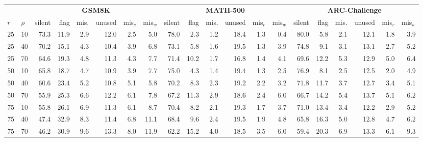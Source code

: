 \begin{tabular}{ll rrrrrr rrrrrr rrrrrr}
\toprule
& & \multicolumn{6}{c}{\textbf{GSM8K}} & \multicolumn{6}{c}{\textbf{MATH-500}} & \multicolumn{6}{c}{\textbf{ARC-Challenge}} \\
\cmidrule(lr){3-8}\cmidrule(lr){9-14}\cmidrule(lr){15-20}
\textbf{$r$} & \textbf{$\rho$} & silent & flag & mis. & unused & mis$_{c}$ & mis$_{w}$ & silent & flag & mis. & unused & mis$_{c}$ & mis$_{w}$ & silent & flag & mis. & unused & mis$_{c}$ & mis$_{w}$ \\
\midrule
25 & 10 & 73.3 & 11.9 & 2.9 & 12.0 & 2.5 & 5.0 & 78.0 & 2.3 & 1.2 & 18.4 & 1.3 & 0.4 & 80.0 & 5.8 & 2.1 & 12.1 & 1.8 & 3.9 \\
25 & 40 & 70.2 & 15.1 & 4.3 & 10.4 & 3.9 & 6.8 & 73.1 & 5.8 & 1.6 & 19.5 & 1.3 & 3.9 & 74.8 & 9.1 & 3.1 & 13.1 & 2.7 & 5.2 \\
25 & 70 & 64.6 & 19.3 & 4.8 & 11.3 & 4.3 & 7.7 & 71.4 & 10.2 & 1.7 & 16.8 & 1.4 & 4.1 & 69.6 & 12.2 & 5.3 & 12.9 & 5.0 & 6.4 \\
50 & 10 & 65.8 & 18.7 & 4.7 & 10.9 & 3.9 & 7.7 & 75.0 & 4.3 & 1.4 & 19.4 & 1.3 & 2.5 & 76.9 & 8.1 & 2.5 & 12.5 & 2.0 & 4.9 \\
50 & 40 & 60.6 & 23.4 & 5.2 & 10.8 & 5.1 & 5.8 & 70.2 & 8.3 & 2.3 & 19.2 & 2.2 & 3.2 & 71.8 & 11.7 & 3.7 & 12.7 & 3.4 & 5.1 \\
50 & 70 & 55.9 & 25.3 & 6.6 & 12.2 & 6.1 & 7.8 & 67.2 & 11.3 & 2.9 & 18.6 & 2.4 & 6.0 & 66.7 & 14.2 & 5.4 & 13.7 & 5.1 & 6.2 \\
75 & 10 & 55.8 & 26.1 & 6.9 & 11.3 & 6.1 & 8.7 & 70.4 & 8.2 & 2.1 & 19.3 & 1.7 & 3.7 & 71.0 & 13.4 & 3.4 & 12.2 & 2.9 & 5.2 \\
75 & 40 & 47.4 & 32.9 & 8.3 & 11.4 & 6.8 & 11.1 & 68.4 & 9.6 & 2.4 & 19.5 & 1.9 & 4.8 & 65.8 & 16.3 & 5.0 & 12.8 & 4.7 & 6.2 \\
75 & 70 & 46.2 & 30.9 & 9.6 & 13.3 & 8.0 & 11.9 & 62.2 & 15.2 & 4.0 & 18.5 & 3.5 & 6.0 & 59.4 & 20.3 & 6.9 & 13.3 & 6.1 & 9.3 \\
\bottomrule
\end{tabular}